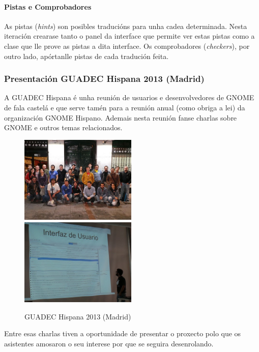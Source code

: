 \paragraph{Pistas e Comprobadores} As pistas (\emph{hints}) son posibles traducións para unha cadea determinada. Nesta iteración crearase tanto o panel da interface que permite ver estas pistas como a clase que lle prove as pistas a dita interface. Os comprobadores (\emph{checkers}), por outro lado, apórtanlle pistas de cada tradución feita.

\subsubsection{Presentación GUADEC Hispana 2013 (Madrid)}

A GUADEC Hispana é unha reunión de usuarios e desenvolvedores de GNOME de fala castelá e que serve tamén para a reunión anual (como obriga a lei) da organización GNOME Hispano. Ademais nesta reunión fanse charlas sobre GNOME e outros temas relacionados.

\begin{figure}[h!]
    \centering
    \includegraphics[width=0.495\textwidth]{img/guadec_es_2013_1.jpg}
    \includegraphics[width=0.495\textwidth]{img/guadec_es_2013_2.jpg}
    \caption{GUADEC Hispana 2013 (Madrid)}
    \label{fig:guadec2012}
\end{figure}

Entre esas charlas tiven a oportunidade de presentar o proxecto polo que os asistentes amosaron o seu interese por que se seguira desenrolando.

